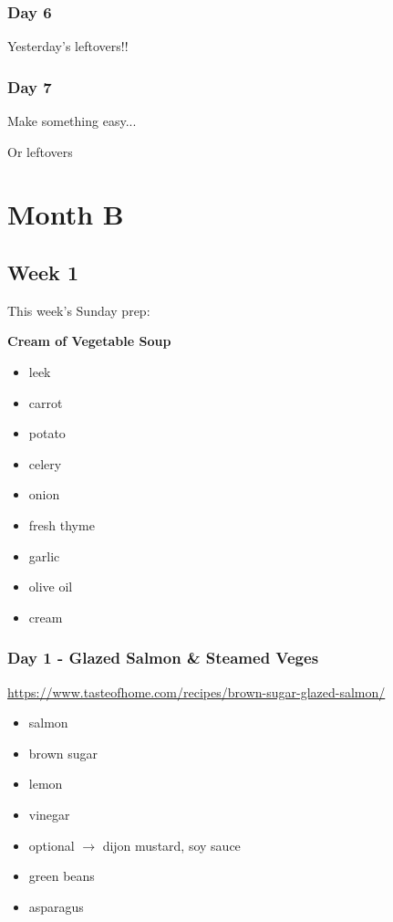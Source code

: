 \documentclass[11pt, a4paper]{article}
\begin{document}
\subsubsection{Day 6}
\vspace{1pc}
Yesterday's leftovers!!

\subsubsection{Day 7}
\vspace{1pc}
\noindent Make something easy...
\par
Or leftovers


\vspace{0.917 pc} %

\pagebreak
\section{Month B}

\subsection{Week 1}

This week's Sunday prep:
\par
\vspace{1pc}
\noindent\textbf{Cream of Vegetable Soup}
\par
\begin{itemize}
\item leek
\item carrot
\item potato
\item celery
\item onion
\item fresh thyme
\item garlic
\item olive oil
\item cream
\end{itemize}

\subsubsection{Day 1 - Glazed Salmon \& Steamed Veges}
\vspace{1pc}
\small{\url{https://www.tasteofhome.com/recipes/brown-sugar-glazed-salmon/}}
\begin{itemize}
\item salmon
\item brown sugar
\item lemon
\item vinegar
\item optional $\longrightarrow$ dijon mustard, soy sauce
\item green beans
\item asparagus
\end{itemize}
\end{document}
